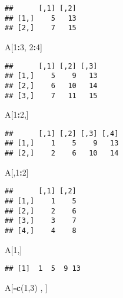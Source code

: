 \documentclass[]{article}
\newenvironment{Shaded}{\begin{snugshade}}{\end{snugshade}}
\newcommand{\KeywordTok}[1]{\textcolor[rgb]{0.13,0.29,0.53}{\textbf{#1}}}
\newcommand{\DecValTok}[1]{\textcolor[rgb]{0.00,0.00,0.81}{#1}}
\newcommand{\OperatorTok}[1]{\textcolor[rgb]{0.81,0.36,0.00}{\textbf{#1}}}
\newcommand{\NormalTok}[1]{#1}
\begin{document}
\begin{verbatim}
##      [,1] [,2]
## [1,]    5   13
## [2,]    7   15
\end{verbatim}

\begin{Shaded}
\begin{Highlighting}[]
\NormalTok{A[}\DecValTok{1}\OperatorTok{:}\DecValTok{3}\NormalTok{, }\DecValTok{2}\OperatorTok{:}\DecValTok{4}\NormalTok{]}
\end{Highlighting}
\end{Shaded}

\begin{verbatim}
##      [,1] [,2] [,3]
## [1,]    5    9   13
## [2,]    6   10   14
## [3,]    7   11   15
\end{verbatim}

\begin{Shaded}
\begin{Highlighting}[]
\NormalTok{A[}\DecValTok{1}\OperatorTok{:}\DecValTok{2}\NormalTok{,]}
\end{Highlighting}
\end{Shaded}

\begin{verbatim}
##      [,1] [,2] [,3] [,4]
## [1,]    1    5    9   13
## [2,]    2    6   10   14
\end{verbatim}

\begin{Shaded}
\begin{Highlighting}[]
\NormalTok{A[,}\DecValTok{1}\OperatorTok{:}\DecValTok{2}\NormalTok{]}
\end{Highlighting}
\end{Shaded}

\begin{verbatim}
##      [,1] [,2]
## [1,]    1    5
## [2,]    2    6
## [3,]    3    7
## [4,]    4    8
\end{verbatim}

\begin{Shaded}
\begin{Highlighting}[]
\NormalTok{A[}\DecValTok{1}\NormalTok{,]}
\end{Highlighting}
\end{Shaded}

\begin{verbatim}
## [1]  1  5  9 13
\end{verbatim}

\begin{Shaded}
\begin{Highlighting}[]
\NormalTok{A[}\OperatorTok{-}\KeywordTok{c}\NormalTok{(}\DecValTok{1}\NormalTok{,}\DecValTok{3}\NormalTok{) , ]}
\end{Highlighting}
\end{Shaded}
\end{document}
